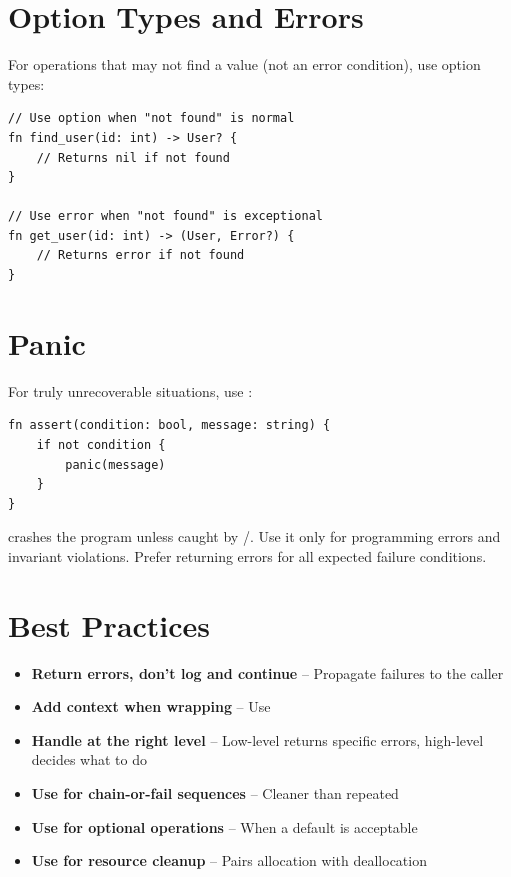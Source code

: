 \section{Option Types and Errors}

For operations that may not find a value (not an error condition), use option types:

\begin{lstlisting}
// Use option when "not found" is normal
fn find_user(id: int) -> User? {
    // Returns nil if not found
}

// Use error when "not found" is exceptional
fn get_user(id: int) -> (User, Error?) {
    // Returns error if not found
}
\end{lstlisting}

\section{Panic}

For truly unrecoverable situations, use :

\begin{lstlisting}
fn assert(condition: bool, message: string) {
    if not condition {
        panic(message)
    }
}
\end{lstlisting}

\begin{warning}
 crashes the program unless caught by /. Use it only for programming errors and invariant violations. Prefer returning errors for all expected failure conditions.
\end{warning}

\section{Best Practices}

\begin{itemize}
    \item \textbf{Return errors, don't log and continue} -- Propagate failures to the caller
    \item \textbf{Add context when wrapping} -- Use 
    \item \textbf{Handle at the right level} -- Low-level returns specific errors, high-level decides what to do
    \item \textbf{Use  for chain-or-fail sequences} -- Cleaner than repeated 
    \item \textbf{Use  for optional operations} -- When a default is acceptable
    \item \textbf{Use  for resource cleanup} -- Pairs allocation with deallocation
\end{itemize}

